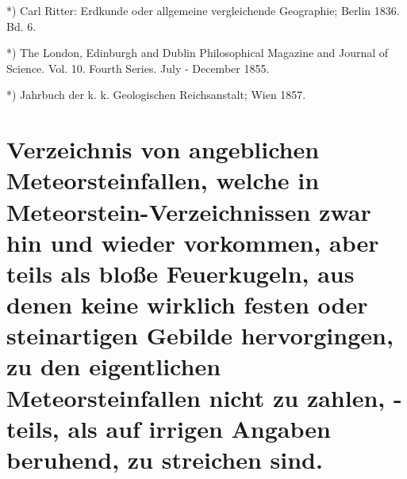 \documentclass[a4paper, 11pt, oneside, polutonikogreek, german]{article}
\begin{document}
*) Carl Ritter: Erdkunde oder allgemeine vergleichende Geographie; Berlin 1836. Bd. 6.

*) The London, Edinburgh and Dublin Philosophical Magazine and Journal of Science. Vol. 10. Fourth Series. July - December 1855.

*) Jahrbuch der k. k. Geologischen Reichsanstalt; Wien 1857.
\clearpage
\section{Verzeichnis von angeblichen Meteorsteinfallen, welche in Meteorstein-Verzeichnissen zwar hin und wieder vorkommen, aber teils als bloße Feuerkugeln, aus denen keine wirklich festen oder steinartigen Gebilde hervorgingen, zu den eigentlichen Meteorsteinfallen nicht zu zahlen, - teils, als auf irrigen Angaben beruhend, zu streichen sind.}
\end{document}
